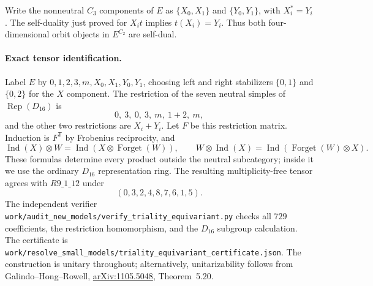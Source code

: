 Write the nonneutral $C_3$ components of $E$ as
$\{X_0,X_1\}$ and $\{Y_0,Y_1\}$, with $X_i^*=Y_i$.
The self-duality just proved for $X_it$ implies $t(X_i)=Y_i$.
Thus both four-dimensional orbit objects in $E^{C_2}$ are self-dual.

\paragraph{Exact tensor identification.}
Label $E$ by
$0,1,2,3,m,X_0,X_1,Y_0,Y_1$, choosing left and right stabilizers
$\{0,1\}$ and $\{0,2\}$ for the $X$ component.
The restriction of the seven neutral simples of
$\operatorname{Rep}(D_{16})$ is
\[
 0,\ 3,\ 0,\ 3,\ m,\ 1+2,\ m,
\]
and the other two restrictions are $X_i+Y_i$.
Let $F$ be this restriction matrix.  Induction is $F^{\mathsf T}$ by
Frobenius reciprocity, and
\[
 \operatorname{Ind}(X)\otimes W
 =\operatorname{Ind}(X\otimes\operatorname{Forget}(W)),\qquad
 W\otimes\operatorname{Ind}(X)
 =\operatorname{Ind}(\operatorname{Forget}(W)\otimes X).
\]
These formulas determine every product outside the neutral subcategory;
inside it we use the ordinary $D_{16}$ representation ring.  The resulting
multiplicity-free tensor agrees with $R9\_1\_12$ under
\[
 (0,3,2,4,8,7,6,1,5).
\]
The independent verifier
\nolinkurl{work/audit_new_models/verify_triality_equivariant.py}
checks all $729$ coefficients, the restriction homomorphism, and the
$D_{16}$ subgroup calculation.  The certificate is
\nolinkurl{work/resolve_small_models/triality_equivariant_certificate.json}.
The construction is unitary throughout; alternatively, unitarizability
follows from Galindo--Hong--Rowell,
\href{https://arxiv.org/abs/1105.5048}{arXiv:1105.5048}, Theorem~5.20.

